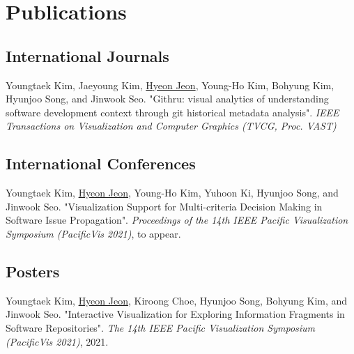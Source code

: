 \documentclass[11pt,a4paper,sans]{moderncv}
\begin{document}
\section{Publications}
\vspace{6pt}



\subsection{International Journals}
\vspace{5pt}

\begin{enumerate}[label={[J\arabic*]}, leftmargin=12.5mm]

\item Youngtaek Kim, Jaeyoung Kim, \underline{Hyeon Jeon}, Young-Ho Kim,  Bohyung Kim, Hyunjoo Song, and Jinwook Seo. "Githru: visual analytics of understanding software development context through git historical metadata analysis". \textit{IEEE Transactions on Visualization and Computer Graphics (TVCG, Proc. VAST)} 



\end{enumerate}

\subsection{International Conferences}
\vspace{5pt}

\begin{enumerate}[label={[C\arabic*]}, leftmargin=12.5mm]



\item Youngtaek Kim, \underline{Hyeon Jeon}, Young-Ho Kim, Yuhoon Ki, Hyunjoo Song, and Jinwook Seo. "Visualization Support for Multi-criteria Decision Making in Software Issue Propagation". \textit{Proceedings of the 14th IEEE Pacific Visualization Symposium (PacificVis 2021)}, to appear.

\end{enumerate}

\subsection{Posters}
\vspace{5pt}

\begin{enumerate}[label={[O\arabic*]}, leftmargin=12.5mm]



\item Youngtaek Kim, \underline{Hyeon Jeon}, Kiroong Choe, Hyunjoo Song, Bohyung Kim, and Jinwook Seo. "Interactive Visualization for Exploring Information Fragments in Software Repositories". \textit{The 14th IEEE Pacific Visualization Symposium (PacificVis 2021)}, 2021.

\end{enumerate}
\end{document}
